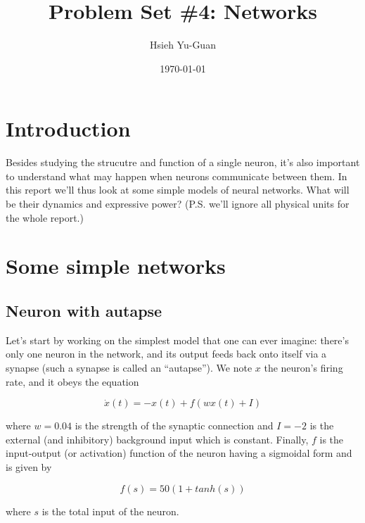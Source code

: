 

\pagestyle{fancy} 
\rfoot{\thepage}
\cfoot{}
\lfoot{~\theauthor}
\renewcommand{\headrulewidth}{0.4pt}
\renewcommand{\footrulewidth}{0.4pt}


\title{Problem Set \#4: Networks \vspace{-0.5em}}
\author{Hsieh Yu-Guan}
\date{\today}
\maketitle

\thispagestyle{fancy}

\section*{Introduction}

Besides studying the strucutre and function of a single neuron, it's also
important to understand what may happen when neurons communicate between them.
In this report we'll thus look at some simple models of neural networks.
What will be their dynamics and expressive power? 
(P.S. we'll ignore all physical units for the whole report.)

\section{Some simple networks}

\subsection{Neuron with autapse}

Let's start by working on the simplest model that one can ever imagine:
there's only one neuron in the network, and its output feeds back onto 
itself via a synapse (such a synapse is called an ``autapse''). 
We note $x$ the neuron's firing rate, and it obeys the equation

\[\dot{x}(t) = -x(t) + f(wx(t)+I)\]

\noindent
where $w = 0.04$ is the strength of the synaptic connection and $I = -2$ 
is the external (and inhibitory) background input which is constant.
Finally, $f$ is the input-output (or activation) function of the neuron having
a sigmoidal form and is given by

\[f(s) = 50(1 + tanh(s))\]

\noindent
where $s$ is the total input of the neuron.

